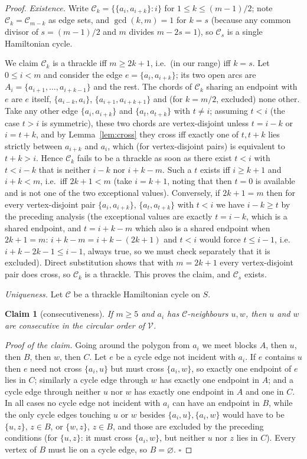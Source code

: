 \documentclass[11pt,a4paper]{article}
\newtheorem{claim}[theorem]{Claim}
\theoremstyle{definition}
\theoremstyle{plain}
\newcommand{\V}{\mathcal{V}}
\newcommand{\mc}{\mathcal{C}}
\begin{document}
\begin{proof}
\emph{Existence.}  Write $\mathcal{C}_k=\{\{a_i,a_{i+k}\}:i\}$ for
$1\le k\le (m-1)/2$; note $\mathcal{C}_k=\mathcal{C}_{m-k}$ as edge sets, and
$\gcd(k,m)=1$ for $k=s$ (because any common divisor of $s=(m-1)/2$ and $m$
divides $m-2s=1$), so $\mathcal{C}_s$ is a single Hamiltonian cycle.

We claim $\mathcal{C}_k$ is a thrackle iff $m\ge2k+1$, i.e.\ (in our range)
iff $k=s$.  Let $0\le i<m$ and consider the edge $e=\{a_i,a_{i+k}\}$; its two
open arcs are $A_i=\{a_{i+1},\dots,a_{i+k-1}\}$ and the rest.  The chords of
$\mathcal{C}_k$ sharing an endpoint with $e$ are $e$ itself,
$\{a_{i-k},a_i\}$, $\{a_{i+1},a_{i+k+1}\}$ and (for $k=m/2$, excluded) none
other.  Take any other edge $\{a_i,a_{i+k}\}$ and $\{a_t,a_{t+k}\}$ with
$t\ne i$; assuming $t<i$ (the case $t>i$ is symmetric), these two chords are
vertex-disjoint unless $t=i-k$ or $i=t+k$, and by Lemma~\ref{lem:cross} they
cross iff exactly one of $t,t+k$ lies strictly between $a_{i+k}$ and $a_i$,
which (for vertex-disjoint pairs) is equivalent to $t+k>i$.  Hence
$\mathcal{C}_k$ fails to be a thrackle as soon as there exist $t<i$ with
$t<i-k$ that is neither $i-k$ nor $i+k-m$.  Such a $t$ exists iff
$i\ge k+1$ and $i+k<m$, i.e.\ iff $2k+1<m$ (take $i=k+1$, noting that then
$t=0$ is available and is not one of the two exceptional values).
Conversely, if $2k+1=m$ then for every vertex-disjoint pair $\{a_i,a_{i+k}\}$,
$\{a_t,a_{t+k}\}$ with $t<i$ we have $i-k\ge t$ by the preceding analysis (the
exceptional values are exactly $t=i-k$, which is a shared endpoint, and
$t=i+k-m$ which also is a shared endpoint when $2k+1=m$: $i+k-m=i+k-(2k+1)$ and
$t<i$ would force $t\le i-1$, i.e. $i+k-2k-1\le i-1$, always true, so we must
check separately that it is excluded).  Direct substitution shows that with
$m=2k+1$ every vertex-disjoint pair does cross, so $\mathcal{C}_k$ is a
thrackle.  This proves the claim, and $\mathcal{C}_s$ exists.

\emph{Uniqueness.}  Let $\mc$ be a thrackle Hamiltonian cycle on $S$.
\begin{claim}[consecutiveness]\label{clm:consec}
If $m\ge5$ and $a_i$ has $\mc$-neighbours $u,w$, then $u$ and $w$ are
consecutive in the circular order of $\V$.
\end{claim}
\emph{Proof of the claim.}  Going around the polygon from $a_i$ we meet blocks
$A$, then $u$, then $B$, then $w$, then $C$.  Let $e$ be a cycle edge not
incident with $a_i$.  If $e$ contains $u$ then $e$ need not cross
$\{a_i,u\}$ but must cross $\{a_i,w\}$, so exactly one endpoint of $e$ lies in
$C$; similarly a cycle edge through $w$ has exactly one endpoint in $A$; and a
cycle edge through neither $u$ nor $w$ has exactly one endpoint in $A$ and one
in $C$.  In all cases no cycle edge not incident with $a_i$ can have an
endpoint in $B$, while the only cycle edges touching $u$ or $w$ besides
$\{a_i,u\},\{a_i,w\}$ would have to be $\{u,z\}$, $z\in B$, or $\{w,z\}$, $z\in
B$, and those are excluded by the preceding conditions (for $\{u,z\}$: it must
cross $\{a_i,w\}$, but neither $u$ nor $z$ lies in $C$).  Every vertex of $B$
must lie on a cycle edge, so $B=\varnothing$. \hfill\(\square\)


\end{proof}
\end{document}
